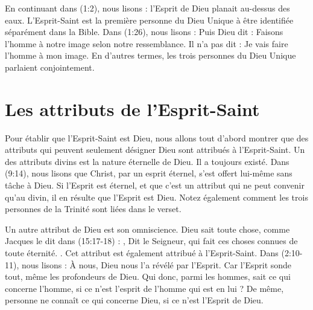 En continuant dans (1:2), nous lisons : \og l'Esprit de Dieu planait au-dessus des eaux. \fg{} L'Esprit-Saint est la première personne du Dieu Unique à être identifiée séparément dans la Bible. Dans (1:26), nous lisons : \og Puis Dieu dit : Faisons l'homme à notre image selon notre ressemblance. \fg{} Il n'a pas dit : \og Je vais faire l'homme à mon image. \fg{} En d'autres termes, les trois personnes du Dieu Unique parlaient conjointement.

\section{Les attributs de l'Esprit-Saint}

Pour établir que l'Esprit-Saint est Dieu, nous allons tout d'abord montrer que des attributs qui peuvent seulement désigner Dieu sont attribués à l'Esprit-Saint. Un des attributs divins est la nature éternelle de Dieu. Il a toujours existé. Dans (9:14), nous lisons que Christ, par un esprit éternel, s'est offert lui-même sans tâche à Dieu. Si l'Esprit est éternel, et que c'est un attribut qui ne peut convenir qu'au divin, il en résulte que l'Esprit est Dieu. Notez également comment les trois personnes de la Trinité sont liées dans le verset.

Un autre attribut de Dieu est son omniscience. Dieu sait toute chose, comme Jacques le dit dans (15:17-18) : \og [...], Dit le Seigneur, qui fait ces choses connues de toute éternité. \fg{} . Cet attribut est également attribué à l'Esprit-Saint. Dans (2:10-11), nous lisons : \og À nous, Dieu nous l'a révélé par l'Esprit. Car l'Esprit sonde tout, même les profondeurs de Dieu. Qui donc, parmi les hommes, sait ce qui concerne l'homme, si ce n'est l'esprit de l'homme qui est en lui ? De même, personne ne connaît ce qui concerne Dieu, si ce n'est l'Esprit de Dieu. \fg{}


